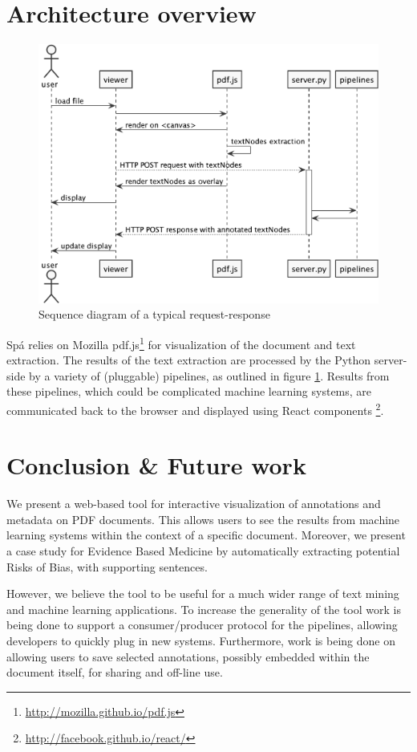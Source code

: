\documentclass[runningheads,a4paper]{llncs}
\begin{document}
\section{Architecture overview}
\label{section:architecture}
\begin{figure}[htb]
\centering
\includegraphics[width=.9\linewidth]{./diagrams/sequence.pdf}
\caption{\label{fig:sequence}Sequence diagram of a typical request-response}
\end{figure}
Spá relies on Mozilla pdf.js\footnote{\url{http://mozilla.github.io/pdf.js}} for visualization of the document and text extraction.
The results of the text extraction are processed by the Python server-side by a variety of (pluggable) pipelines, as outlined in figure \ref{fig:sequence}.
Results from these pipelines, which could be complicated machine learning systems, are communicated back to the browser and displayed using React components \footnote{\url{http://facebook.github.io/react/}}.

\section{Conclusion \& Future work}
We present a web-based tool for interactive visualization of annotations and metadata on PDF documents.
This allows users to see the results from machine learning systems within the context of a specific document.
Moreover, we present a case study for Evidence Based Medicine by automatically extracting potential Risks of Bias, with supporting sentences.

However, we believe the tool to be useful for a much wider range of text mining and machine learning applications.
To increase the generality of the tool work is being done to support a consumer/producer protocol for the pipelines, allowing developers to quickly plug in new systems.
Furthermore, work is being done on allowing users to save selected annotations, possibly embedded within the document itself, for sharing and off-line use.
\end{document}
